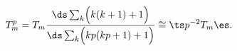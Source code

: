 \begin{equation}
T^p _m = T_m \frac{\ds \sum\nolimits_k \Bigl( k(k+1)+1 \Bigr)}
{\ds \sum\nolimits_k \Bigl( kp(kp+1)+1 \Bigr)} 
\cong \ts p^{-2} T_m \es. 
\label{eq:tnsnMmbrn}
\end{equation}

